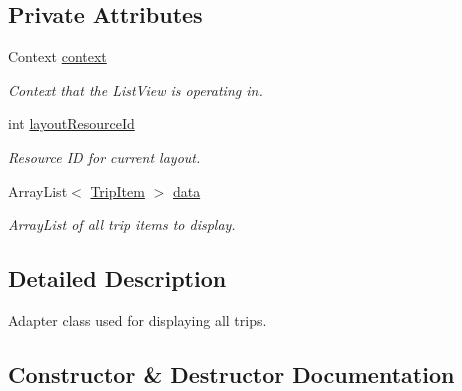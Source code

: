 \subsection*{Private Attributes}
\begin{DoxyCompactItemize}
\item 
\mbox{\label{class_android_app_1_1_trip_list_adapter_a14fa25bc6de0af86497d0cce3e0bdc1b}} 
Context \hyperlink{class_android_app_1_1_trip_list_adapter_a14fa25bc6de0af86497d0cce3e0bdc1b}{context}
\begin{DoxyCompactList}\small\item\em Context that the List\+View is operating in. \end{DoxyCompactList}\item 
\mbox{\label{class_android_app_1_1_trip_list_adapter_a57cb58f32f3b9ea25c6330a821cb8455}} 
int \hyperlink{class_android_app_1_1_trip_list_adapter_a57cb58f32f3b9ea25c6330a821cb8455}{layout\+Resource\+Id}
\begin{DoxyCompactList}\small\item\em Resource ID for current layout. \end{DoxyCompactList}\item 
\mbox{\label{class_android_app_1_1_trip_list_adapter_a8cea45e06b19821352bce2de9b3e3941}} 
Array\+List$<$ \hyperlink{class_android_app_1_1_trip_item}{Trip\+Item} $>$ \hyperlink{class_android_app_1_1_trip_list_adapter_a8cea45e06b19821352bce2de9b3e3941}{data}
\begin{DoxyCompactList}\small\item\em Array\+List of all trip items to display. \end{DoxyCompactList}\end{DoxyCompactItemize}


\subsection{Detailed Description}
Adapter class used for displaying all trips. 

\subsection{Constructor \& Destructor Documentation}
\mbox{\label{class_android_app_1_1_trip_list_adapter_ad8d8c6f5a394a8d7e6e97d5bf239af76}} 
